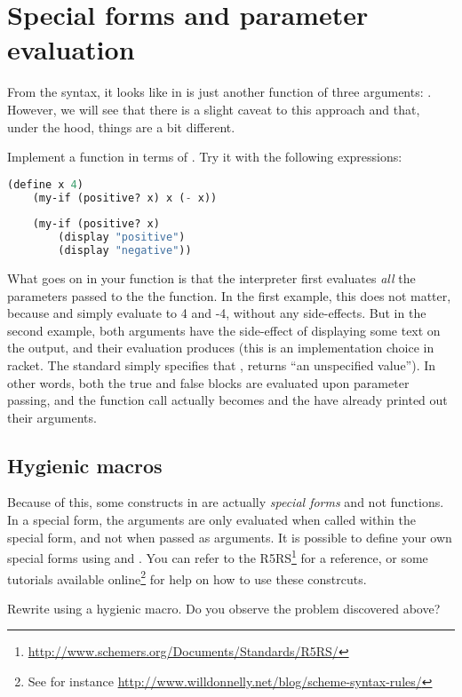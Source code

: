 \documentclass{../../../tp}
\begin{document}
\section{Special forms and parameter evaluation}

From the syntax, it looks like  in \scheme is just another function of three arguments: . However, we will see that there is a slight caveat to this approach and that, under the hood, things are a bit different.

\begin{instruction}
	Implement a  function in terms of . Try it with the following expressions:
	
	\begin{lstlisting}[language=lisp]
	(define x 4)
	(my-if (positive? x) x (- x))
	
	(my-if (positive? x) 
		(display "positive") 
		(display "negative"))
	\end{lstlisting}
\end{instruction}

What goes on in your  function is that the interpreter first evaluates \emph{all} the parameters passed to the the function. In the first example, this does not matter, because  and  simply evaluate to 4 and -4, without any side-effects. But in the second example, both arguments have the side-effect of displaying some text on the output, and their evaluation produces  (this is an implementation choice in racket. The standard simply specifies that , returns ``an unspecified value''). In other words, both the true and false blocks are evaluated upon parameter passing, and the function call actually becomes  and the  have already printed out their arguments.  

\subsection{Hygienic macros}

Because of this, some constructs in \scheme are actually \emph{special forms} and not functions. In a special form, the arguments are only evaluated when called within the special form, and not when passed as arguments. It is possible to define your own special forms using  and . You can refer to the R5RS\footnote{\url{http://www.schemers.org/Documents/Standards/R5RS/}} for a reference, or some tutorials available online\footnote{See for instance \url{http://www.willdonnelly.net/blog/scheme-syntax-rules/}} for help on how to use these constrcuts.

\begin{instruction}
Rewrite  using a hygienic macro. Do you observe the problem discovered above? 	
\end{instruction}
\end{document}
